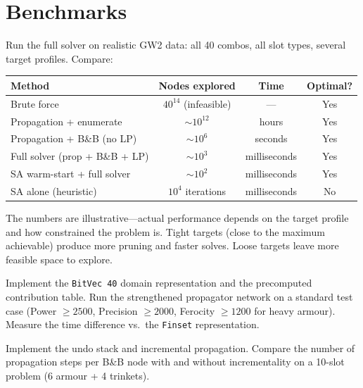 \documentclass[11pt, a4paper, oneside]{book}
\begin{document}
\section{Benchmarks}

Run the full solver on realistic GW2 data: all 40 combos, all slot types,
several target profiles.  Compare:

\begin{center}
\small
\begin{tabular}{lccc}
\toprule
\textbf{Method} & \textbf{Nodes explored} & \textbf{Time} & \textbf{Optimal?} \\
\midrule
Brute force & $40^{14}$ (infeasible) & --- & Yes \\
Propagation + enumerate & $\sim 10^{12}$ & hours & Yes \\
Propagation + B\&B (no LP) & $\sim 10^{6}$ & seconds & Yes \\
Full solver (prop + B\&B + LP) & $\sim 10^{3}$ & milliseconds & Yes \\
SA warm-start + full solver & $\sim 10^{2}$ & milliseconds & Yes \\
SA alone (heuristic) & $10^{4}$ iterations & milliseconds & No \\
\bottomrule
\end{tabular}
\end{center}

The numbers are illustrative---actual performance depends on the target
profile and how constrained the problem is.  Tight targets (close to the
maximum achievable) produce more pruning and faster solves.  Loose targets
leave more feasible space to explore.

\begin{exercisebox}
Implement the \texttt{BitVec 40} domain representation and the precomputed
contribution table.  Run the strengthened propagator network on a standard
test case (Power $\geq 2500$, Precision $\geq 2000$, Ferocity $\geq 1200$
for heavy armour).  Measure the time difference vs.\ the \texttt{Finset}
representation.
\end{exercisebox}

\begin{exercisebox}
Implement the undo stack and incremental propagation.  Compare the number
of propagation steps per B\&B node with and without incrementality on a
10-slot problem (6 armour + 4 trinkets).
\end{exercisebox}

\end{document}
